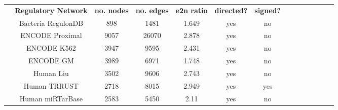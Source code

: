     \begin{table}[H]%
        \centering
        \setlength\arrayrulewidth{.1pt}%
        \scriptsize
            \setlength\cellspacetoplimit{\myPadTop}\setlength\cellspacebottomlimit{\myPadBottom}
            \begin{tabular}{@{}Sc Sc|Sc|Sc|Sc|Sc|Sc@{}}
                    & \textbf{\normalsize Regulatory Network} & \textbf{\normalsize no. nodes} & \textbf{\normalsize no. edges}	& \textbf{\normalsize e2n ratio} & \textbf{\normalsize directed? } & \textbf{\normalsize signed? }%
                            \\[.05cm] 
                                    & Bacteria RegulonDB  \cite{gama-castro_regulondb_2016} & 898       & 1481      & 1.649    & yes & no %
                            \\[.05cm] 
                                    &  ENCODE Proximal  \cite{gerstein_architecture_2012}   & 9057      & 26070     & 2.878    & yes & no %
                            \\[.05cm] 
                                    &  ENCODE K562  \cite{gerstein_architecture_2012}       & 3947      & 9595      & 2.431    & yes & no %
                            \\[.05cm] 
                                    &  ENCODE GM  \cite{gerstein_architecture_2012}         & 3989      & 6971      & 1.748    & yes & no %
                            \\[.05cm] 
                                    & Human Liu  \cite{liu_regnetwork:_2015}                & 3502      & 9606      & 2.743    & yes & no %
                            \\[.05cm] 
                                    & Human TRRUST  \cite{han_trrust:_2015}                 & 2718      & 8015      & 2.949    & yes & yes %
                            \\[.05cm] 
                                    & Human miRTarBase  \cite{chou_mirtarbase_2016}         & 2583      & 5450      & 2.11     & yes & no %
                            \\[.05cm] 

\end{tabular}
\end{table}
